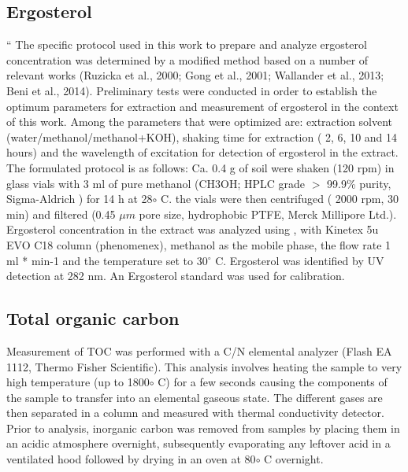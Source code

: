 \documentclass[12pt]{report}
\begin{document}
		\subsection{Ergosterol}
``		%
		The specific protocol used in this work to prepare and analyze ergosterol concentration was determined by a modified method based on a number of relevant works (Ruzicka et al., 2000; Gong et al., 2001; Wallander et al., 2013; Beni et al., 2014). Preliminary tests were conducted in order to establish the optimum parameters for extraction and measurement of ergosterol in the context of this work. Among the parameters that were optimized are: extraction solvent (water/methanol/methanol+KOH), shaking time for extraction ( 2, 6, 10 and 14 hours) and the wavelength of excitation for detection of ergosterol in the extract. The formulated protocol is as follows: Ca. 0.4 g of soil were shaken (120 rpm) in glass vials with 3 ml of pure methanol (CH3OH; HPLC grade $ > $ 99.9\% purity, Sigma-Aldrich ) for 14 h at 28$ \circ $ C. the vials were then centrifuged ( 2000 rpm, 30 min) and filtered (0.45 $ \mu m $ pore size, hydrophobic PTFE, Merck Millipore Ltd.). Ergosterol concentration in the extract was analyzed using  , with Kinetex 5u EVO C18 column (phenomenex), methanol as the mobile phase, the flow rate 1 ml * min-1 and the temperature set to 30$ ^\circ $  C. Ergosterol was identified by UV detection at 282 nm. An Ergosterol standard was used for calibration.
		
		
		\subsection{Total organic carbon}
		
		Measurement of TOC was performed with a C/N elemental analyzer (Flash EA 1112, Thermo Fisher Scientific). This analysis involves heating the sample to very high temperature (up to 1800$\circ$ C) for a few seconds causing the components of the sample to transfer into an elemental gaseous state. The different gases are then separated in a column and measured with thermal conductivity detector. Prior to analysis, inorganic carbon was removed from samples by placing them in an acidic atmosphere overnight, subsequently evaporating any leftover acid in a ventilated hood followed by drying in an oven at 80$\circ$ C overnight.
		
\end{document}
